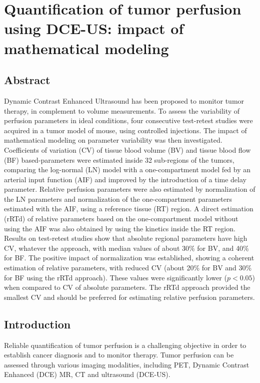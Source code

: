 

\chapter{Quantification of tumor perfusion using DCE-US: impact of mathematical modeling}\label{chapter:PMB}

\section{Abstract}
Dynamic Contrast Enhanced Ultrasound has been proposed to monitor tumor therapy, in complement to volume measurements. To assess the variability of perfusion parameters in  ideal conditions, four consecutive test-retest studies were acquired in a tumor model of mouse, using controlled injections. The impact of mathematical modeling on parameter variability was then investigated. Coefficients of variation (CV) of tissue blood volume (BV) and tissue blood flow (BF) based-parameters were estimated inside 32 sub-regions of the tumors, comparing the log-normal (LN) model with a one-compartment model fed by an arterial input function (AIF) and improved by the introduction of a time delay parameter. Relative perfusion parameters were also estimated by normalization of the LN parameters and normalization of the one-compartment parameters estimated with the AIF, using a reference tissue (RT) region. A direct estimation (rRTd) of relative parameters  based on the one-compartment model without using the AIF was also obtained by using the kinetics inside the RT region.  Results on test-retest studies show that absolute regional parameters have high CV, whatever the approach, with median values of about 30\% for BV, and 40\% for BF. The positive impact of normalization was established, showing a coherent estimation of relative parameters, with reduced CV (about 20\% for BV and 30\% for BF using the rRTd approach). These values were significantly lower ($p<0.05$) when compared to CV of absolute parameters. The rRTd approach provided the smallest CV and should be preferred for estimating relative perfusion parameters. 

\section{Introduction}
Reliable quantification of tumor perfusion is a challenging objective in order to establish cancer diagnosis and to monitor therapy. Tumor perfusion can be assessed through various imaging modalities, including PET, Dynamic Contrast Enhanced (DCE) MR, CT  and ultrasound (DCE-US).

